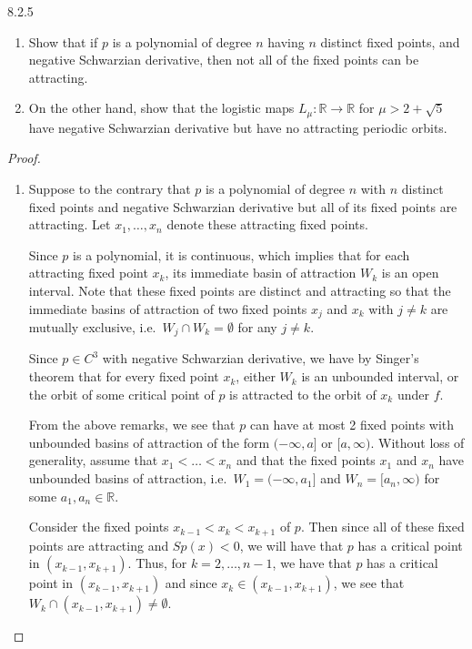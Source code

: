 \begin{problem}{8.2.5}
  \begin{enumerate}
    \item Show that if $p$ is a polynomial of degree $n$ having $n$ distinct
      fixed points, and negative Schwarzian derivative, then not all of the fixed points can
      be attracting.
    \item On the other hand, show that the logistic maps $L_\mu: \mathbb{R} \to \mathbb{R}$
      for $\mu > 2 + \sqrt{5}$ have negative Schwarzian derivative but have no attracting periodic orbits.
  \end{enumerate}
\end{problem}

\begin{proof}
  \begin{enumerate}
    \item Suppose to the contrary that $p$ is a polynomial of degree $n$ with $n$
      distinct fixed points and negative Schwarzian derivative but all of its fixed points
      are attracting. Let $x_1, \dots, x_n$ denote these attracting fixed points.

      Since $p$ is a polynomial, it is continuous, which implies that for each attracting
      fixed point $x_k$, its immediate basin of attraction $W_k$ is an open interval.
      Note that these fixed points are distinct and attracting so that the immediate basins of attraction
      of two fixed points $x_j$ and $x_k$ with $j\neq k$ are mutually exclusive, i.e.\ $W_j \cap W_k = \emptyset$
      for any $j\neq k$.

      Since $p\in C^3$ with negative Schwarzian derivative, we have by Singer's theorem
      that for every fixed point $x_k$, either $W_k$ is an unbounded interval,
      or the orbit of some critical point of $p$ is attracted to the orbit of $x_k$ under $f$.

      From the above remarks, we see that $p$ can have at most 2 fixed points with unbounded basins of attraction of the form $(-\infty, a]$ or $[a, \infty)$.
      Without loss of generality, assume that $x_1 < \dots < x_n$ and that the fixed points $x_1$ and $x_n$ have unbounded basins of attraction, i.e.\
      $W_1 = (-\infty, a_1]$ and $W_n = [a_n, \infty)$ for some $a_1, a_n\in\mathbb{R}$.

      Consider the fixed points $x_{k-1} < x_k < x_{k+1}$ of $p$. Then since all of these fixed points are attracting
      and $Sp(x) < 0$, we will have that $p$ has a critical point in $(x_{k-1}, x_{k+1})$. Thus, for $k=2,\dots,n-1$,
      we have that $p$ has a critical point in $(x_{k-1}, x_{k+1})$ and since $x_k \in (x_{k-1}, x_{k+1})$,
      we see that $W_k \cap (x_{k-1}, x_{k+1}) \neq \emptyset$.



\end{enumerate}
\end{proof}
